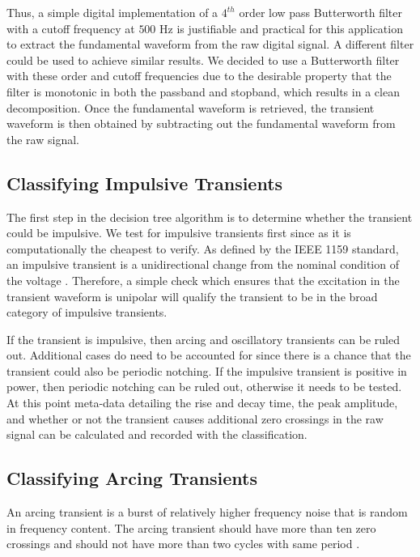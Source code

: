 \documentclass[10pt, conference, compsocconf]{IEEEtran}
\begin{document}
Thus, a simple digital implementation of a $4^{th}$ order low pass Butterworth filter with a cutoff frequency at $500$ Hz is justifiable and practical for this application to extract the fundamental waveform from the raw digital signal. A different filter could be used to achieve similar results. We decided to use a Butterworth filter with these order and cutoff frequencies due to the desirable property that the filter is monotonic in both the passband and stopband, which results in a clean decomposition. Once the fundamental waveform is retrieved, the transient waveform is then obtained by subtracting out the fundamental waveform from the raw signal.

\subsection{Classifying Impulsive Transients}

The first step in the decision tree algorithm is to determine whether the transient could be impulsive. We test for impulsive transients first since as it is computationally the cheapest to verify. As defined by the IEEE 1159 standard, an impulsive transient is a unidirectional change from the nominal condition of the voltage \cite{IEEE:2018:1159D3}. Therefore, a simple check which ensures that the excitation in the transient waveform is unipolar will qualify the transient to be in the broad category of impulsive transients.

If the transient is impulsive, then arcing and oscillatory transients can be ruled out. Additional cases do need to be accounted for since there is a chance that the transient could also be periodic notching. If the impulsive transient is positive in power, then periodic notching can be ruled out, otherwise it needs to be tested. At this point meta-data detailing the rise and decay time, the peak amplitude, and whether or not the transient causes additional zero crossings in the raw signal can be calculated and recorded with the classification.

\subsection{Classifying Arcing Transients}

An arcing transient is a burst of relatively higher frequency noise that is random in frequency content. The arcing transient should have more than ten zero crossings and should not have more than two cycles with same period \cite{IEEE:2018:1159D3}.
\end{document}
